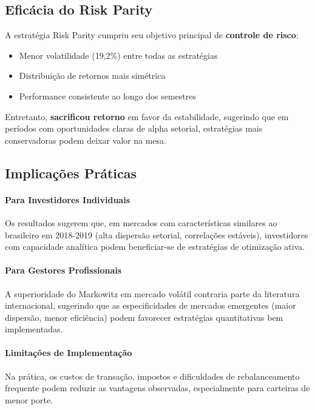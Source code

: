 \subsection{Eficácia do Risk Parity}

A estratégia Risk Parity cumpriu seu objetivo principal de \textbf{controle de risco}:

\begin{itemize}
    \item Menor volatilidade (19,2\%) entre todas as estratégias
    \item Distribuição de retornos mais simétrica
    \item Performance consistente ao longo dos semestres
\end{itemize}

Entretanto, \textbf{sacrificou retorno} em favor da estabilidade, sugerindo que em períodos com oportunidades claras de alpha setorial, estratégias mais conservadoras podem deixar valor na mesa.

\subsection{Implicações Práticas}

\paragraph{Para Investidores Individuais}
Os resultados sugerem que, em mercados com características similares ao brasileiro em 2018-2019 (alta dispersão setorial, correlações estáveis), investidores com capacidade analítica podem beneficiar-se de estratégias de otimização ativa.

\paragraph{Para Gestores Profissionais}
A superioridade do Markowitz em mercado volátil contraria parte da literatura internacional, sugerindo que as especificidades de mercados emergentes (maior dispersão, menor eficiência) podem favorecer estratégias quantitativas bem implementadas.

\paragraph{Limitações de Implementação}
Na prática, os custos de transação, impostos e dificuldades de rebalanceamento frequente podem reduzir as vantagens observadas, especialmente para carteiras de menor porte.

